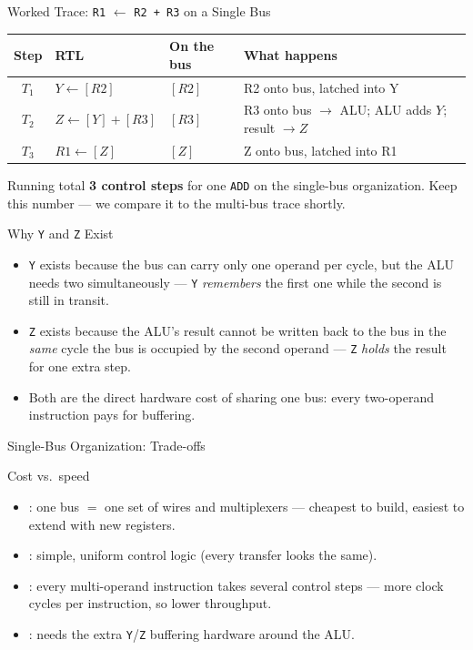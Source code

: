 \documentclass[aspectratio=169]{beamer}
\begin{document}
\begin{frame}{Worked Trace: \texttt{R1} $\gets$ \texttt{R2 + R3} on a Single Bus}
  \footnotesize
  \begin{tabular}{@{}clll@{}}
    \toprule
    \textbf{Step} & \textbf{RTL} & \textbf{On the bus} & \textbf{What happens} \\
    \midrule
    $T_1$ & $Y \gets [R2]$            & $[R2]$      & R2 onto bus, latched into Y \\
    $T_2$ & $Z \gets [Y] + [R3]$      & $[R3]$      & R3 onto bus $\to$ ALU; ALU adds $Y$; result $\to Z$ \\
    $T_3$ & $R1 \gets [Z]$            & $[Z]$       & Z onto bus, latched into R1 \\
    \bottomrule
  \end{tabular}
  \vspace{0.3cm}
  \begin{alertblock}{Running total}
    \textbf{3 control steps} for one \texttt{ADD} on the single-bus organization.
    Keep this number --- we compare it to the multi-bus trace shortly.
  \end{alertblock}
\end{frame}

\begin{frame}{Why \texttt{Y} and \texttt{Z} Exist}
  \begin{itemize}
    \item \texttt{Y} exists because the bus can carry only one operand per cycle,
      but the ALU needs two simultaneously --- \texttt{Y} \emph{remembers} the
      first one while the second is still in transit.
    \item \texttt{Z} exists because the ALU's result cannot be written back to the
      bus in the \emph{same} cycle the bus is occupied by the second operand ---
      \texttt{Z} \emph{holds} the result for one extra step.
    \item Both are the direct hardware cost of sharing one bus: every two-operand
      instruction pays for buffering.
  \end{itemize}
\end{frame}

\begin{frame}{Single-Bus Organization: Trade-offs}
  \begin{block}{Cost vs.\ speed}
    \begin{itemize}
      \item {}: one bus $=$ one set of wires and multiplexers --- cheapest
        to build, easiest to extend with new registers.
      \item {}: simple, uniform control logic (every transfer looks the same).
      \item {}: every multi-operand instruction takes several control steps
        --- more clock cycles per instruction, so lower throughput.
      \item {}: needs the extra \texttt{Y}/\texttt{Z} buffering hardware
        around the ALU.
    \end{itemize}
  \end{block}
\end{frame}
\end{document}
